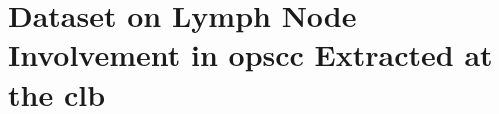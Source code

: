 \documentclass[\relativeRoot/main.tex]{subfiles}
\begin{document}
\chapter[
    CLB Dataset on Lymph Node Involvement in OPSCC
]{
    Dataset on Lymph Node Involvement in \acrlong{opscc} Extracted at the \gls{clb}
}
\label{chap:dataset_clb}







\end{document}
